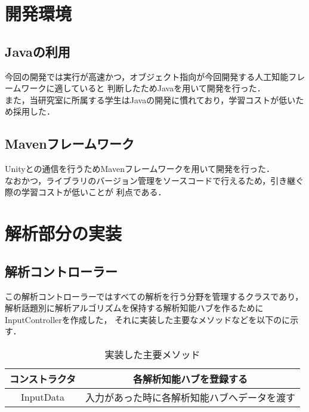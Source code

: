 
\section{開発環境}
\subsection{Javaの利用}
今回の開発では実行が高速かつ，オブジェクト指向が今回開発する人工知能フレームワークに適していると
判断したためJavaを用いて開発を行った．\\
また，当研究室に所属する学生はJavaの開発に慣れており，学習コストが低いため採用した．\\

\subsection{Mavenフレームワーク}
Unityとの通信を行うためMavenフレームワークを用いて開発を行った．\\
なおかつ，ライブラリのバージョン管理をソースコードで行えるため，引き継ぐ際の学習コストが低いことが
利点である．\\

\section{解析部分の実装}
\subsection{解析コントローラー}
この解析コントローラーではすべての解析を行う分野を管理するクラスであり，
解析話題別に解析アルゴリズムを保持する解析知能ハブを作るためにInputControllerを作成した，
それに実装した主要なメソッドなどを以下のに示す．\\

\begin{table}[tbh]
	\caption{実装した主要メソッド} \label{tab:InputController}
	\begin{center}
		\begin{tabular}[htb]{c|c}
		\hline
		コンストラクタ & 各解析知能ハブを登録する \\
		\hline
		InputData & 入力があった時に各解析知能ハブへデータを渡す \\
		\hline
		\end{tabular}
	\end{center}
\end{table}


